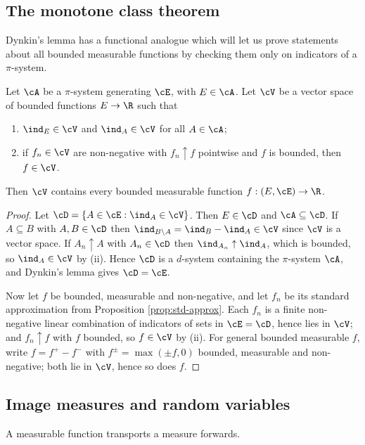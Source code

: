 \subsection{The monotone class theorem}

Dynkin's lemma has a functional analogue which will let us prove statements about all bounded measurable functions by checking them only on indicators of a $\pi$-system.

\begin{theorem}\label{thm:mct-class}
	Let $\cA$ be a $\pi$-system generating $\cE$, with $E \in \cA$. Let $\cV$ be a vector space of bounded functions $E \to \R$ such that
	\begin{enumerate}[label=(\roman*)]
		\item $\ind_E \in \cV$ and $\ind_A \in \cV$ for all $A \in \cA$;
		\item if $f_n \in \cV$ are non-negative with $f_n \uparrow f$ pointwise and $f$ is bounded, then $f \in \cV$.
	\end{enumerate}
	Then $\cV$ contains every bounded measurable function $f: (E,\cE) \to \R$.
\end{theorem}
\begin{proof}
	Let $\cD = \{A \in \cE : \ind_A \in \cV\}$. Then $E \in \cD$ and $\cA \subseteq \cD$. If $A \subseteq B$ with $A,B \in \cD$ then $\ind_{B\setminus A} = \ind_B - \ind_A \in \cV$ since $\cV$ is a vector space. If $A_n \uparrow A$ with $A_n \in \cD$ then $\ind_{A_n} \uparrow \ind_A$, which is bounded, so $\ind_A \in \cV$ by (ii). Hence $\cD$ is a $d$-system containing the $\pi$-system $\cA$, and Dynkin's lemma gives $\cD = \cE$.

	Now let $f$ be bounded, measurable and non-negative, and let $f_n$ be its standard approximation from Proposition \ref{prop:std-approx}. Each $f_n$ is a finite non-negative linear combination of indicators of sets in $\cE = \cD$, hence lies in $\cV$; and $f_n \uparrow f$ with $f$ bounded, so $f \in \cV$ by (ii). For general bounded measurable $f$, write $f = f^+ - f^-$ with $f^\pm = \max(\pm f, 0)$ bounded, measurable and non-negative; both lie in $\cV$, hence so does $f$.
\end{proof}

\subsection{Image measures and random variables}

A measurable function transports a measure forwards.

